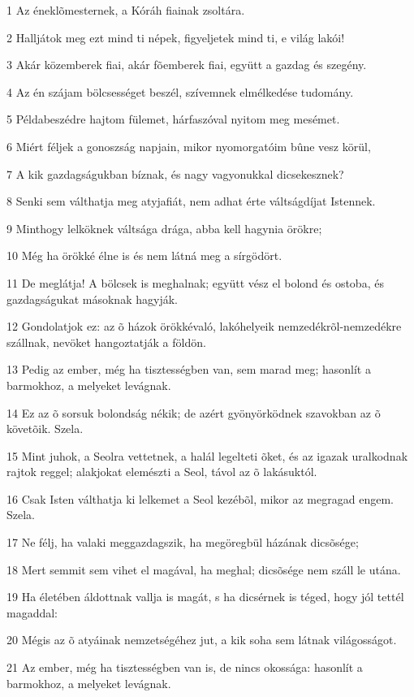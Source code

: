 \par 1 Az éneklõmesternek, a Kóráh fiainak zsoltára.
\par 2 Halljátok meg ezt mind ti népek, figyeljetek mind ti, e világ lakói!
\par 3 Akár közemberek fiai, akár fõemberek fiai, együtt a gazdag és szegény.
\par 4 Az én szájam bölcsességet beszél, szívemnek elmélkedése tudomány.
\par 5 Példabeszédre hajtom fülemet, hárfaszóval nyitom meg mesémet.
\par 6 Miért féljek a gonoszság napjain, mikor nyomorgatóim bûne vesz körül,
\par 7 A kik gazdagságukban bíznak, és nagy vagyonukkal dicsekesznek?
\par 8 Senki sem válthatja meg atyjafiát, nem adhat érte váltságdíjat Istennek.
\par 9 Minthogy lelköknek váltsága drága, abba kell hagynia örökre;
\par 10 Még ha örökké élne is és nem látná meg a sírgödört.
\par 11 De meglátja! A bölcsek is meghalnak; együtt vész el bolond és ostoba, és gazdagságukat másoknak hagyják.
\par 12 Gondolatjok ez: az õ házok örökkévaló, lakóhelyeik nemzedékrõl-nemzedékre szállnak, nevöket hangoztatják a földön.
\par 13 Pedig az ember, még ha tisztességben van, sem marad meg; hasonlít a barmokhoz, a melyeket levágnak.
\par 14 Ez az õ sorsuk bolondság nékik; de azért gyönyörködnek szavokban az õ követõik. Szela.
\par 15 Mint juhok, a Seolra vettetnek, a halál legelteti õket, és az igazak uralkodnak rajtok reggel; alakjokat elemészti a Seol, távol az õ lakásuktól.
\par 16 Csak Isten válthatja ki lelkemet a Seol kezébõl, mikor az megragad engem. Szela.
\par 17 Ne félj, ha valaki meggazdagszik, ha megöregbül házának dicsõsége;
\par 18 Mert semmit sem vihet el magával, ha meghal; dicsõsége nem száll le utána.
\par 19 Ha életében áldottnak vallja is magát, s ha dicsérnek is téged, hogy jól tettél magaddal:
\par 20 Mégis az õ atyáinak nemzetségéhez jut, a kik soha sem látnak világosságot.
\par 21 Az ember, még ha tisztességben van is, de nincs okossága: hasonlít a barmokhoz, a melyeket levágnak.

